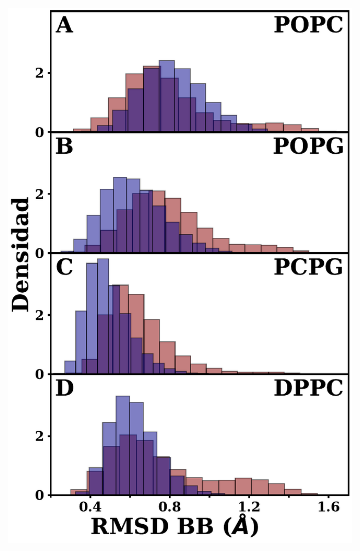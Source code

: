 \begin{figure}[H]
    \centering
    \begin{subfigure}[t]{0.45\textwidth}
        \centering
        \subcaption{}
        \includegraphics[width=1\linewidth, height=0.99\textheight, keepaspectratio]{fig/02_dm/rmsd_all.pdf} 
    \end{subfigure}
    \begin{subfigure}[t]{0.45\textwidth}
        \centering
        \subcaption{}

\end{subfigure}
\end{figure}
